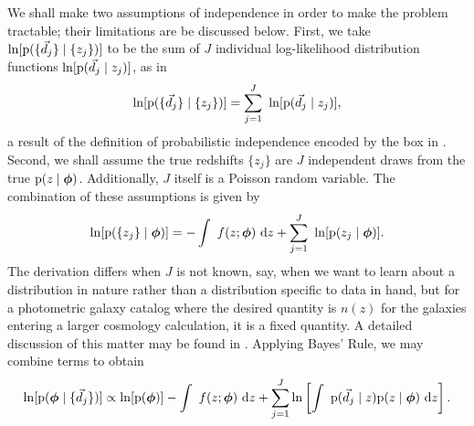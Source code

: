 We shall make two assumptions of independence in order to make the problem tractable; their limitations are be discussed below.  
First, we take $\ln[\mathrm{p}(\{\vec{d}_{j}\} \mid \{z_{j}\})]$ to be the sum of $J$ individual log-likelihood distribution functions $\ln[\mathrm{p}(\vec{d}_{j} \mid z_{j})]$, as in 
\begin{equation}
\eqlabel{eq:indiedat}
\ln[\pr{\{\data_{j}\} \gvn \{z_{j}\}}] = \sum_{j=1}^{J}\ \ln[\pr{\data_{j} \gvn z_{j}}],
\end{equation}
a result of the definition of probabilistic independence encoded by the box in .
Second, we shall assume the true redshifts $\{z_{j}\}$ are $J$ independent draws from the true $\mathrm{p}(z \mid {\ensuremath{\boldsymbol{\phi}}})$.  
Additionally, $J$ itself is a Poisson random variable.  
The combination of these assumptions is given by 
\begin{equation}
\eqlabel{eq:indie}
\ln[\pr{\{z_{j}\} \gvn \ndphi}] = -\integral{f(z; \ndphi)}{z} + \sum_{j=1}^{J}\ \ln[\pr{z_{j} \gvn \ndphi}].
\end{equation}
The derivation differs when $J$ is not known, say, when we want to learn about a distribution in nature rather than a distribution specific to data in hand, but for a photometric galaxy catalog where the desired quantity is $n(z)$ for the galaxies entering a larger cosmology calculation, it is a fixed quantity.
A detailed discussion of this matter may be found in \citet{Foreman-Mackey2014}.  
Applying Bayes' Rule, we may combine terms to obtain 
\begin{equation}
\eqlabel{eq:posterior}
\ln[\pr{\ndphi \gvn \{\data_{j}\}}] \propto \ln[\pr{\ndphi}] - \integral{f(z; \ndphi)}{z} + \sum_{j=1}^{J}\ln\left[\integral{\pr{\data_{j} \gvn z} \pr{z \gvn \ndphi}}{z}\right].
\end{equation}


